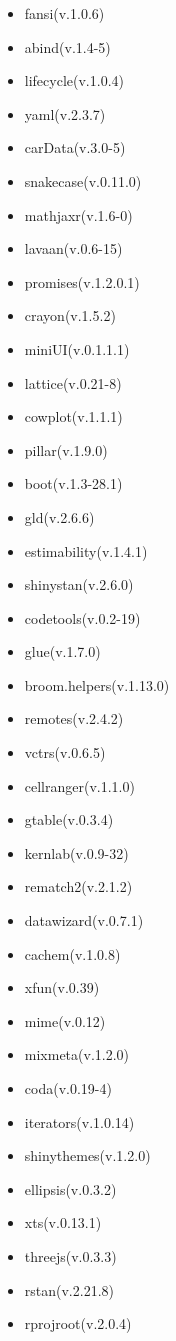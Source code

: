 \documentclass[
]{article}
\begin{document}
\begin{itemize}
\item
  fansi(v.1.0.6)
\item
  abind(v.1.4-5)
\item
  lifecycle(v.1.0.4)
\item
  yaml(v.2.3.7)
\item
  carData(v.3.0-5)
\item
  snakecase(v.0.11.0)
\item
  mathjaxr(v.1.6-0)
\item
  lavaan(v.0.6-15)
\item
  promises(v.1.2.0.1)
\item
  crayon(v.1.5.2)
\item
  miniUI(v.0.1.1.1)
\item
  lattice(v.0.21-8)
\item
  cowplot(v.1.1.1)
\item
  pillar(v.1.9.0)
\item
  boot(v.1.3-28.1)
\item
  gld(v.2.6.6)
\item
  estimability(v.1.4.1)
\item
  shinystan(v.2.6.0)
\item
  codetools(v.0.2-19)
\item
  glue(v.1.7.0)
\item
  broom.helpers(v.1.13.0)
\item
  remotes(v.2.4.2)
\item
  vctrs(v.0.6.5)
\item
  cellranger(v.1.1.0)
\item
  gtable(v.0.3.4)
\item
  kernlab(v.0.9-32)
\item
  rematch2(v.2.1.2)
\item
  datawizard(v.0.7.1)
\item
  cachem(v.1.0.8)
\item
  xfun(v.0.39)
\item
  mime(v.0.12)
\item
  mixmeta(v.1.2.0)
\item
  coda(v.0.19-4)
\item
  iterators(v.1.0.14)
\item
  shinythemes(v.1.2.0)
\item
  ellipsis(v.0.3.2)
\item
  xts(v.0.13.1)
\item
  threejs(v.0.3.3)
\item
  rstan(v.2.21.8)
\item
  rprojroot(v.2.0.4)

\end{itemize}
\end{document}
